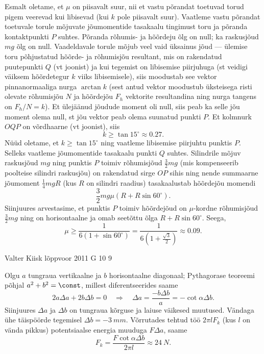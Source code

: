 \documentclass[11pt]{article}
\begin{document}
{{Esmalt oletame, et $\mu$ on piisavalt suur, nii et vastu põrandat toetuvad torud pigem veerevad kui libisevad (kui $k$ pole piisavalt suur). Vaatleme vastu põrandat toetuvale torule mõjuvate jõumomentide tasakaalu tingimust toru ja põranda kontaktpunkti $P$ suhtes. Põranda rõhumis- ja hõõrdeju õlg on null; ka raskusjõud $mg$ õlg on null. Vaadeldavale torule mõjub veel vaid üksainus jõud --- ülemise toru põhjustatud hõõrde- ja rõhumisjõu resultant, mis on rakendatud puutepunkti $Q$ (vt joonist) ja kui tegemist on libisemise piirjuhuga (st veidigi väiksem hõõrdetegur $k$ viiks libisemisele), siis moodustab see vektor pinnanormaaliga nurga $\arctan k$ (sest antud vektor moodustub üksteisega risti olevate rõhumisjõu $N$ ja hõõrdejõu $F_h$ vektorite resultandina ning nurga tangens on $F_h/N=k$). Et ülejäänud jõudude moment oli null, siis peab ka selle jõu moment olema null,
st jõu vektor peab olema suunatud punkti $P$. Et kolmnurk $OQP$ on võrdhaarne (vt joonist),
siis
\[
k\ge \tan 15^\circ\approx \num{0,27}.
\]
Nüüd oletame, et $k \ge \tan 15^\circ$ ning vaatleme libisemise piirjuhtu punktis $P$. Selleks vaatleme jõumomentide tasakaalu punkti $Q$ suhtes.
Silindrile mõjuv raskusjõud $mg$ ning punktis $P$ toimiv rõhumisjõud $\frac 32 mg$ (mis kompenseerib poolteise silindri raskusjõu) on rakendatud sirge $OP$ sihis ning nende summaarne jõumoment $\frac 14mgR$ (kus $R$ on silindri raadius) tasakaalustab hõõrdejõu momendi 
\[
\frac 32 mg\mu \left(R+R\sin 60^\circ\right).
\]
Siinjuures arvestasime, et punktis $P$ toimiv hõõrdejõud on $\mu$-kordne rõhumisjõud $\frac 32 mg$ ning on horisontaalne ja omab seetõttu õlga $R+R\sin 60^\circ$. Seega,
\[
\mu \ge \frac{1}{6\left(1+\sin 60^\circ\right)}=\frac{1}{6\left(1+\frac{\sqrt 3}{2}\right)}\approx \num{0,09}.
\]
\fi
}

{Valter Kiisk} %
{lõppvoor} %
{2011} %
{G 10} %
{9} %
{

\ifSolution
\osa Olgu $a$ tungraua vertikaalne ja $b$ horisontaalne diagonaal; Pythagorase teoreemi
põhjal $a^2 + b^2 = \const$, millest diferentseerides saame
\[
2 a \Delta a+2 b \Delta b=0 \quad \Rightarrow \quad \Delta a=\frac{-b \Delta b}{a}=-\cot \alpha \Delta b.
\]
Siinjuures $\Delta a$ ja $\Delta b$ on tungraua kõrguse ja laiuse väikesed muutused. Vändaga ühe
täispöörde tegemisel $\Delta b = \SI{-3}{mm}$. Võrrutades tehtud töö $2\pi lF_k$ (kus $l$ on vända
pikkus) potentsiaalse energia muuduga $F\Delta a$, saame
\[
F_{k} =\frac{F \cot \alpha \Delta b}{2 \pi l} \approx \SI{24}{N}.
\]

}}
\end{document}
